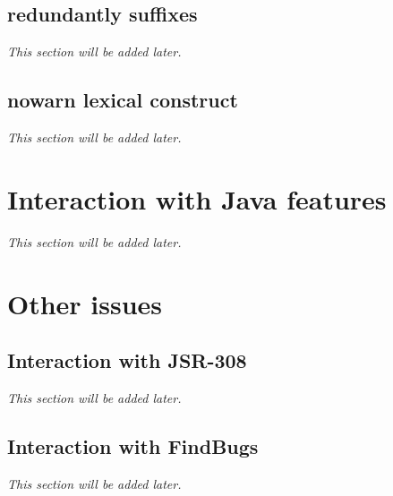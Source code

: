 \subsection{redundantly suffixes}
\textit{This section will be added later.} %

\subsection{nowarn lexical construct}

\textit{This section will be added later.} %


\section{Interaction with Java features}

\textit{This section will be added later.} %


\section{Other issues}

\subsection{Interaction with JSR-308}
\textit{This section will be added later.} %

\subsection{Interaction with FindBugs}

\textit{This section will be added later.} %

